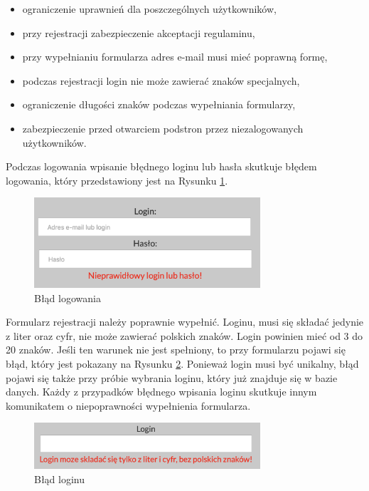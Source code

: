 \documentclass[eng,printmode,openany,oneside]{mgr}
\begin{document}
\begin{itemize}
	\item ograniczenie uprawnień dla poszczególnych użytkowników,
	\item przy rejestracji zabezpieczenie akceptacji regulaminu,
	\item przy wypełnianiu formularza adres e-mail musi mieć poprawną formę,
	\item podczas rejestracji login nie może zawierać znaków specjalnych,
	\item ograniczenie długości znaków podczas wypełniania formularzy,
	\item zabezpieczenie przed otwarciem podstron przez niezalogowanych użytkowników.
\end{itemize}

Podczas logowania wpisanie błędnego loginu lub hasła skutkuje błędem logowania, który przedstawiony jest na Rysunku \ref{fig:9}.

	\begin{figure}[H]
		\centering
		\includegraphics[width=0.75\textwidth]{blad_logowania}
		\caption{Błąd logowania}
		\label{fig:9}
	\end{figure}
	
Formularz rejestracji należy poprawnie wypełnić. Loginu, musi się składać jedynie z liter oraz cyfr, nie może zawierać polskich znaków. Login powinien mieć od 3 do 20 znaków. Jeśli ten warunek nie jest spełniony, to przy formularzu pojawi się błąd, który jest pokazany na Rysunku \ref{fig:10}. Ponieważ login musi być unikalny, błąd pojawi się także przy próbie wybrania loginu, który już znajduje się w bazie danych. Każdy z przypadków błędnego wpisania loginu skutkuje innym komunikatem o niepoprawności wypełnienia formularza.

	\begin{figure}[H]
		\centering
		\includegraphics[width=0.75\textwidth]{rejestracja_login}
		\caption{Błąd loginu}
		\label{fig:10}
	\end{figure}
	
\end{document}
